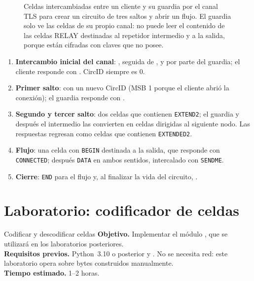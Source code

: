 \begin{figure}[htbp]
\centering

\caption{Celdas intercambiadas entre un cliente y su guardia por el canal TLS para crear un circuito de tres saltos y abrir un flujo. El guardia solo ve las celdas de su propio canal: no puede leer el contenido de las celdas RELAY destinadas al repetidor intermedio y a la salida, porque están cifradas con claves que no posee.}
\label{fig:sessione}
\end{figure}

\begin{enumerate}
  \item \textbf{Intercambio inicial del canal}: , seguida de ,  y  por parte del guardia; el cliente responde con . CircID siempre es 0.
  \item \textbf{Primer salto}:  con un nuevo CircID (MSB 1 porque el cliente abrió la conexión); el guardia responde con .
  \item \textbf{Segundo y tercer salto}: dos celdas  que contienen \texttt{EXTEND2}; el guardia y después el intermedio las convierten en celdas  dirigidas al siguiente nodo. Las respuestas regresan como celdas  que contienen \texttt{EXTENDED2}.
  \item \textbf{Flujo}: una celda con \texttt{BEGIN} destinada a la salida, que responde con \texttt{CONNECTED}; después \texttt{DATA} en ambos sentidos, intercalado con \texttt{SENDME}.
  \item \textbf{Cierre}: \texttt{END} para el flujo y, al finalizar la vida del circuito, .
\end{enumerate}

\section{Laboratorio: codificador de celdas}\label{sec:lab-celle}

\begin{laboratorio}[2]{Codificar y descodificar celdas}
\textbf{Objetivo.} Implementar el módulo , que se utilizará en los laboratorios posteriores.\\
\textbf{Requisitos previos.} Python~3.10 o posterior y . No se necesita red: este laboratorio opera sobre bytes construidos manualmente.\\
\textbf{Tiempo estimado.} 1--2 horas.
\end{laboratorio}

